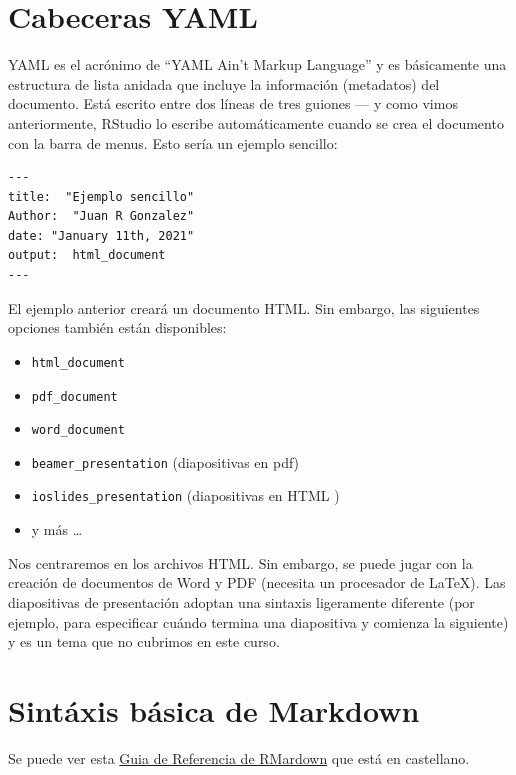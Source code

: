 \documentclass[
]{book}
\providecommand{\tightlist}{%
  \setlength{\itemsep}{0pt}\setlength{\parskip}{0pt}}
\begin{document}
\hypertarget{cabeceras-yaml}{%
\section{Cabeceras YAML}\label{cabeceras-yaml}}

YAML es el acrónimo de ``YAML Ain't Markup Language'' y es básicamente una estructura de lista anidada que incluye la información (metadatos) del documento. Está escrito entre dos líneas de tres guiones --- y como vimos anteriormente, RStudio lo escribe automáticamente cuando se crea el documento con la barra de menus. Esto sería un ejemplo sencillo:

\begin{verbatim}
--- 
title:  "Ejemplo sencillo"  
Author:  "Juan R Gonzalez"  
date: "January 11th, 2021"  
output:  html_document
--- 
\end{verbatim}

El ejemplo anterior creará un documento HTML. Sin embargo, las siguientes opciones también están disponibles:

\begin{itemize}
\tightlist
\item
  \texttt{html\_document}
\item
  \texttt{pdf\_document}
\item
  \texttt{word\_document}
\item
  \texttt{beamer\_presentation} (diapositivas en pdf)
\item
  \texttt{ioslides\_presentation} (diapositivas en HTML )
\item
  y más \ldots{}
\end{itemize}

Nos centraremos en los archivos HTML. Sin embargo, se puede jugar con la creación de documentos de Word y PDF (necesita un procesador de LaTeX). Las diapositivas de presentación adoptan una sintaxis ligeramente diferente (por ejemplo, para especificar cuándo termina una diapositiva y comienza la siguiente) y es un tema que no cubrimos en este curso.

\hypertarget{sintuxe1xis-buxe1sica-de-markdown}{%
\section{Sintáxis básica de Markdown}\label{sintuxe1xis-buxe1sica-de-markdown}}

Se puede ver esta \href{https://rstudio.com/wp-content/uploads/2015/03/rmarkdown-spanish.pdf}{Guia de Referencia de RMardown} que está en castellano.
\end{document}
